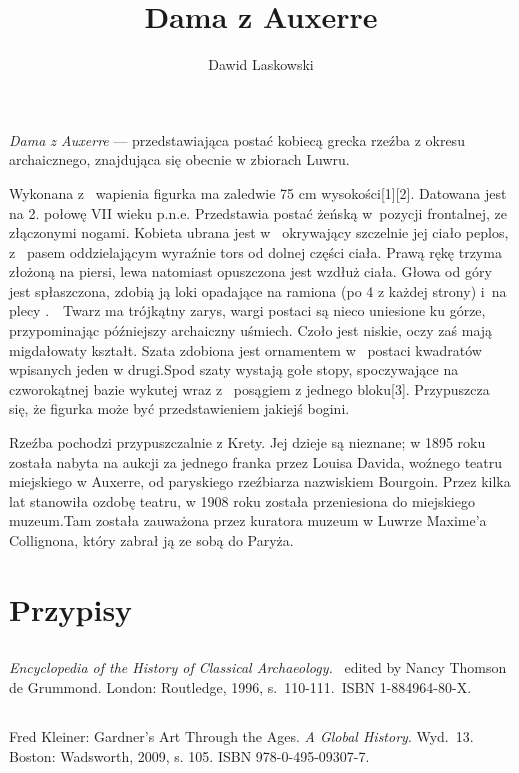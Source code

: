 \documentclass[a4paper,12pt]{article}
\title{Dama z Auxerre}
\author{Dawid Laskowski}
\begin{document}
\maketitle 
 \emph{Dama z Auxerre} --- przedstawiająca postać kobiecą grecka rzeźba z okresu archaicznego, znajdująca się obecnie w zbiorach Luwru.

Wykonana z~ wapienia figurka ma zaledwie 75 cm wysokości[1][2]. Datowana jest na 2. połowę VII wieku p.n.e. Przedstawia postać żeńską w~pozycji frontalnej, ze złączonymi nogami. Kobieta ubrana jest w~ okrywający szczelnie jej ciało peplos, z~ pasem oddzielającym wyraźnie tors od dolnej części ciała. Prawą rękę trzyma złożoną na piersi, lewa natomiast opuszczona jest wzdłuż ciała. Głowa od góry jest spłaszczona, zdobią ją loki opadające na ramiona (po 4 z każdej strony) i~na plecy .~~Twarz ma trójkątny zarys, wargi postaci są nieco uniesione ku górze, przypominając późniejszy archaiczny uśmiech. Czoło jest niskie, oczy zaś mają migdałowaty kształt. Szata zdobiona jest ornamentem w~ postaci kwadratów wpisanych jeden w drugi.Spod szaty wystają gołe stopy, spoczywające na czworokątnej bazie wykutej wraz z~ posągiem z jednego bloku[3]. Przypuszcza się, że figurka może być przedstawieniem jakiejś bogini.

Rzeźba pochodzi przypuszczalnie z Krety. Jej dzieje są nieznane; w 1895 roku została nabyta na aukcji za jednego franka przez Louisa Davida, woźnego teatru miejskiego w Auxerre, od paryskiego rzeźbiarza nazwiskiem Bourgoin. Przez kilka lat stanowiła ozdobę teatru, w 1908 roku została przeniesiona do miejskiego muzeum.Tam została zauważona przez kuratora muzeum w Luwrze Maxime’a Collignona, który zabrał ją ze sobą do Paryża.

\section{Przypisy}\label{sec:tekst}
\subsection{}\label{sec:tekst} \emph{Encyclopedia of the History of Classical Archaeology.}~ edited by Nancy Thomson de Grummond. London: Routledge, 1996, s.~110-111.~ISBN 1-884964-80-X.
\subsection{}\label{sec:tekst} 
 Fred Kleiner: Gardner’s Art Through the Ages. \emph {A Global History}. Wyd.~13. Boston: Wadsworth, 2009, s. 105. ISBN 978-0-495-09307-7.
\end{document}
